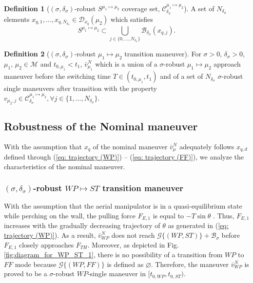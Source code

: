 \documentclass[letterpaper, 10 pt, conference]{ieeeconf}  %
\theoremstyle{definition}
\newtheorem{definition}{Definition}
\begin{document}
\begin{definition}[$(\sigma,\delta_{\sigma})$-robust $S^{\mu_1 \mapsto \mu_2}$ coverage set, $\mathcal{C}^{\mu_1 \mapsto \mu_2}_{\delta_\sigma}$] \label{def: C_delta_sigma}
A set of $N_{\delta_{\sigma}}$ elements $x_{q, 1},...,x_{q, N_{\delta_{\sigma}}} \in \mathcal{D}_{x_q}(\mu_2)$ which satisfies
\begin{equation}
    S^{\mu_1 \mapsto \mu_2} \subset \bigcup_{j \in \{ 0, ..., N_{\delta_{\sigma}} \}} \mathcal{B}_{\delta_{\sigma}}(x_{q, j}).
\end{equation}
\end{definition}

\begin{definition} [$(\sigma,\delta_{\sigma})$-robust $\mu_{1} \mapsto \mu_{2}$ transition maneuver] \label{def: definition of robust transition}
For $\sigma > 0$, $\delta_{\sigma} > 0$, $\mu_1$, $\mu_2 \in \mathcal{M}$ and $t_{0, \mu_1} < t_1$, $\bar{v}^N_{\mu_1}$ which is a union of a $\sigma$-robust $\mu_{1} \mapsto \mu_{2}$ approach maneuver before the switching time $T \in (t_{0, \mu_1}, t_1)$ and of a set of $N_{\delta_{\sigma}}$ $\sigma$-robust single maneuvers after transition with the property $v_{\mu_2, j} \in \mathcal{C}^{\mu_1 \mapsto \mu_2}_{\delta_\sigma}, \forall j \in \{ 1, ..., N_{\delta_{\sigma}}\}$. 
\end{definition}

\subsection{Robustness of the Nominal maneuver}
With the assumption that $x_q$ of the nominal maneuver $\bar{v}^N_{\mu}$ adequately follows {$x_{q, d}$} defined through (\ref{eq: trajectory (WP)}) -- (\ref{eq: trajectory (FF)}), we analyze the characteristics of the nominal maneuver. 
\subsubsection{$(\sigma, \delta_{\sigma})$-robust $WP \mapsto ST$ transition maneuver}
With the assumption that the aerial manipulator is in a quasi-equilibrium state while perching on the wall, the pulling force $F_{E, 1}$ is equal to $-T\sin \theta$ \cite{kim2015operating}. Thus, $F_{E, 1}$ increases with the gradually decreasing trajectory of $\theta$ as generated in (\ref{eq: trajectory (WP)}). As a result, $\bar{v}^N_{WP}$ does not reach $\mathcal{G}\{ (WP, ST) \} + \mathcal{B}_{\sigma}$ before $F_{E, 1}$ closely approaches $F_{TH}$. Moreover, as depicted in Fig. \ref{fig:diagram_for_WP_ST_1}, there is no possibility of a transition from $WP$ to $FF$ mode because $\mathcal{G}\{ (WP, FF) \}$ is defined as $\varnothing$. Therefore, the maneuver $\bar{v}^N_{WP}$ is proved to be a $\sigma$-robust $WP$-single maneuver in $[t_{0, WP}, t_{0, ST})$. 
\end{document}
